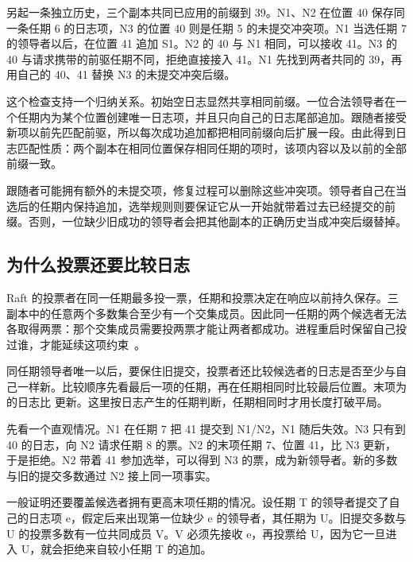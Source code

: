 另起一条独立历史，三个副本共同已应用的前缀到 39。N1、N2 在位置 40 保存同一条任期 6 的日志项，N3 的位置 40 则是任期 5 的未提交冲突项。N1 当选任期 7 的领导者以后，在位置 41 追加 S1。N2 的 40 与 N1 相同，可以接收 41。N3 的 40 与请求携带的前驱任期不同，拒绝直接接入 41。N1 先找到两者共同的 39，再用自己的 40、41 替换 N3 的未提交冲突后缀。


这个检查支持一个归纳关系。初始空日志显然共享相同前缀。一位合法领导者在一个任期内为某个位置创建唯一日志项，并且只向自己的日志尾部追加。跟随者接受新项以前先匹配前驱，所以每次成功追加都把相同前缀向后扩展一段。由此得到日志匹配性质：两个副本在相同位置保存相同任期的项时，该项内容以及以前的全部前缀一致。

跟随者可能拥有额外的未提交项，修复过程可以删除这些冲突项。领导者自己在当选后的任期内保持追加，选举规则则要保证它从一开始就带着过去已经提交的前缀。否则，一位缺少旧成功的领导者会把其他副本的正确历史当成冲突后缀替掉。

\subsection*{为什么投票还要比较日志}

Raft 的投票者在同一任期最多投一票，任期和投票决定在响应以前持久保存。三副本中的任意两个多数集合至少有一个交集成员。因此同一任期的两个候选者无法各取得两票：那个交集成员需要投两票才能让两者都成功。进程重启时保留自己投过谁，才能延续这项约束~\cite{raft}。

同任期领导者唯一以后，要保住旧提交，投票者还比较候选者的日志是否至少与自己一样新。比较顺序先看最后一项的任期，再在任期相同时比较最后位置。末项为  的日志比  更新。这里按日志产生的任期判断，任期相同时才用长度打破平局。


先看一个直观情况。N1 在任期 7 把 41 提交到 N1/N2，N1 随后失效。N3 只有到 40 的日志，向 N2 请求任期 8 的票。N2 的末项任期 7、位置 41，比 N3 更新，于是拒绝。N2 带着 41 参加选举，可以得到 N3 的票，成为新领导者。新的多数与旧的提交多数通过 N2 接上同一项事实。

一般证明还要覆盖候选者拥有更高末项任期的情况。设任期 T 的领导者提交了自己的日志项 e，假定后来出现第一位缺少 e 的领导者，其任期为 U。旧提交多数与 U 的投票多数有一位共同成员 V。V 必须先接收 e，再投票给 U，因为它一旦进入 U，就会拒绝来自较小任期 T 的追加。

